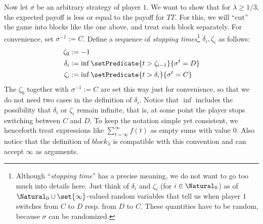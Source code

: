 \documentclass{scrartcl}
\begin{document}
Now let $\sigma$ be an arbitrary strategy of player $1$. We want to show that
for $\lambda \geq 1/3$, the expected payoff is less or equal to the payoff for
$TT$. For this, we will ``cut'' the game into blocks like the one above, and 
treat each block separately. For convenience, set $\sigma^{-1} := C$.
Define a sequence of \emph{stopping times}\footnote{
Although ``\emph{stopping time}'' has a precise
meaning, we do not want to go too much 
into details here. Just think of $\delta_i$ and $\zeta_i$ 
(for $i \in \Natural_0$) as of 
$\Natural_0 \cup \set{\infty}$-valued random variables that tell us 
when player $1$ switches from $C$ to $D$ resp. from $D$ to $C$. 
These quantities have to be random, because $\sigma$ can be randomized.
} $\delta_i, \zeta_i$ as follows: 
\begin{align*}
  \zeta_{0}  &:= -1  \\
  \delta_{i} &:= \inf\setPredicate{t > \zeta_{i-1}}{\sigma^t = D} \\
  \zeta_{i}  &:= \inf\setPredicate{t > \delta_{i}}{\sigma^t = C}
\end{align*}
The $\zeta_{0}$ together with $\sigma^{-1} := C$ are set this way just for 
convenience, so that we do not need two cases in the definition of $\delta_i$.
Notice that $\inf$ includes the possibility that $\delta_i$ or $\zeta_i$ remain
infinite, that is, at some point the player stops switching between $C$ and $D$.
To keep the notation simple yet consistent, we henceforth treat expressions
like $\sum_{t = \infty}^\infty f(t)$ as empty sums with value $0$. Also notice
that the definition of $block_\lambda$ is compatible with this convention and
can accept $\infty$ as arguments.
\end{document}
